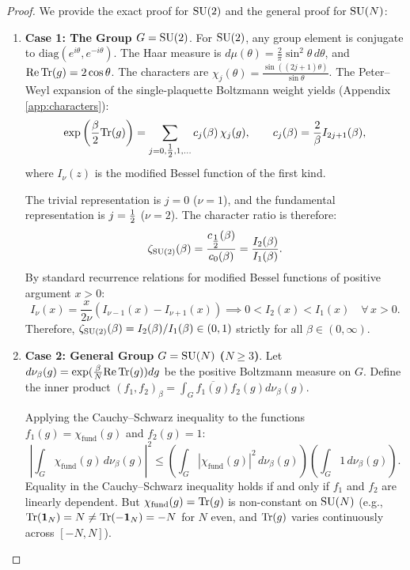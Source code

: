 \begin{proof}
We provide the exact proof for $\mathrm{SU}(2)$ and the general proof for $\mathrm{SU}(N)$:
\begin{enumerate}
    \item \textbf{Case 1: The Group $G = \mathrm{SU}(2)$}. For $\mathrm{SU}(2)$, any group element is conjugate to $\mathrm{diag}(e^{i\theta}, e^{-i\theta})$. The Haar measure is $d\mu(\theta) = \frac{2}{\pi} \sin^2\theta \, d\theta$, and $\mathrm{Re} \, \mathrm{Tr}(g) = 2 \cos\theta$. 
    The characters are $\chi_j(\theta) = \frac{\sin((2j+1)\theta)}{\sin\theta}$.
    The Peter--Weyl expansion of the single-plaquette Boltzmann weight yields (Appendix \ref{app:characters}):
    \begin{equation}
    \exp\left( \frac{\beta}{2} \mathrm{Tr}(g) \right) = \sum_{j=0, \tfrac{1}{2}, 1, \dots} c_j(\beta) \, \chi_j(g), \qquad c_j(\beta) = \frac{2}{\beta} I_{2j+1}(\beta),
    \end{equation}
    where $I_\nu(z)$ is the modified Bessel function of the first kind.
    
    The trivial representation is $j = 0$ ($\nu = 1$), and the fundamental representation is $j = \tfrac{1}{2}$ ($\nu = 2$). The character ratio is therefore:
    \begin{equation}
    \label{eq:ch11_su2_bessel_ratio}
    \zeta_{\mathrm{SU}(2)}(\beta) = \frac{c_{\tfrac{1}{2}}(\beta)}{c_0(\beta)} = \frac{I_2(\beta)}{I_1(\beta)}.
    \end{equation}
    By standard recurrence relations for modified Bessel functions of positive argument $x > 0$:
    \begin{equation}
    I_\nu(x) = \frac{x}{2\nu} \left( I_{\nu-1}(x) - I_{\nu+1}(x) \right) \implies 0 < I_2(x) < I_1(x) \quad \forall \, x > 0.
    \end{equation}
    Therefore, $\zeta_{\mathrm{SU}(2)}(\beta) = I_2(\beta) / I_1(\beta) \in (0, 1)$ strictly for all $\beta \in (0, \infty)$.
    
    \item \textbf{Case 2: General Group $G = \mathrm{SU}(N)$ ($N \ge 3$)}. Let $d\nu_\beta(g) = \exp(\frac{\beta}{N}\mathrm{Re}\,\mathrm{Tr}(g)) dg$ be the positive Boltzmann measure on $G$. Define the inner product $(f_1, f_2)_\beta = \int_G \overline{f_1(g)} f_2(g) d\nu_\beta(g)$. 
    
    Applying the Cauchy--Schwarz inequality to the functions $f_1(g) = \chi_{\mathrm{fund}}(g)$ and $f_2(g) = 1$:
    \begin{equation}
    \left| \int_G \chi_{\mathrm{fund}}(g) \, d\nu_\beta(g) \right|^2 \le \left( \int_G |\chi_{\mathrm{fund}}(g)|^2 \, d\nu_\beta(g) \right) \left( \int_G 1 \, d\nu_\beta(g) \right).
    \end{equation}
    Equality in the Cauchy--Schwarz inequality holds if and only if $f_1$ and $f_2$ are linearly dependent. But $\chi_{\mathrm{fund}}(g) = \mathrm{Tr}(g)$ is non-constant on $\mathrm{SU}(N)$ (e.g., $\mathrm{Tr}(\mathbf{1}_N) = N \neq \mathrm{Tr}(-\mathbf{1}_N) = -N$ for $N$ even, and $\mathrm{Tr}(g)$ varies continuously across $[-N, N]$). 
    

\end{enumerate}
\end{proof}
